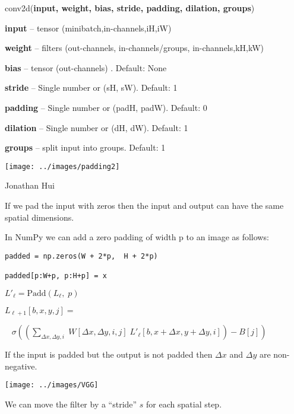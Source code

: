 {

conv2d({\bf input, weight, bias, stride, padding, dilation, groups})

\bigskip
{\bf input} – tensor (minibatch,in-channels,iH,iW)

\medskip
{\bf weight} – filters (out-channels, in-channels/groups, in-channels,kH,kW)

\medskip
{\bf bias} – tensor (out-channels) . Default: None

\medskip
{\bf stride} – Single number or (sH, sW). Default: 1

\medskip
{\bf padding} – Single number or (padH, padW). Default: 0

\medskip
{\bf dilation} – Single number or (dH, dW). Default: 1

\medskip
{\bf groups} – split input into groups. Default: 1


\centerline{\texttt{[image: ../images/padding2]}}
\centerline{\large Jonathan Hui}

\vfill
If we pad the input with zeros then the input and output can have the same spatial dimensions.


In NumPy we can add a zero padding of width p to an image as follows:

\vfill
\begin{verbatim}
padded = np.zeros(W + 2*p,  H + 2*p)

padded[p:W+p, p:H+p] = x
\end{verbatim}


$L'_{{\ell}} = \mathrm{Padd}(L_{{\ell}},\;p)$

\vfill
$L_{{\ell+1}}[b,x,y,j] =$

\vfill
$\;\;\;\sigma\left(\left(\sum_{\Delta x, \Delta y, i}\;W[\Delta x, \Delta y, i,j]\;L'_{{\ell}}[b,x + \Delta x, y + \Delta y, i]\right) - B[j] \right)$

\vfill
If the input is padded but the output is not padded then $\Delta x$ and $\Delta y$ are non-negative.


\centerline{\texttt{[image: ../images/VGG]}}


We can move the filter by a ``stride'' $s$ for each spatial step.

}
